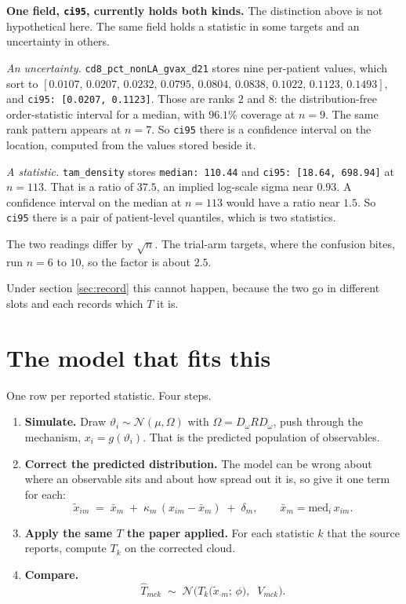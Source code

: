 \documentclass[11pt]{article}
\newcommand{\Ncal}{\mathcal{N}}
\begin{document}
\begin{assumpbox}
\textbf{One field, \texttt{ci95}, currently holds both kinds.} The distinction
above is not hypothetical here. The same field holds a statistic in some targets
and an uncertainty in others.

\emph{An uncertainty.} \texttt{cd8\_pct\_nonLA\_gvax\_d21} stores nine per-patient
values, which sort to $[0.0107,\,0.0207,\,0.0232,\,0.0795,\,0.0804,\,0.0838,\,
0.1022,\,0.1123,\,0.1493]$, and \texttt{ci95: [0.0207, 0.1123]}. Those are ranks
$2$ and $8$: the distribution-free order-statistic interval for a median, with
$96.1\%$ coverage at $n=9$. The same rank pattern appears at $n=7$. So
\texttt{ci95} there is a confidence interval on the location, computed from the
values stored beside it.

\emph{A statistic.} \texttt{tam\_density} stores \texttt{median: 110.44} and
\texttt{ci95: [18.64, 698.94]} at $n=113$. That is a ratio of $37.5$, an implied
log-scale sigma near $0.93$. A confidence interval on the median at $n=113$ would
have a ratio near $1.5$. So \texttt{ci95} there is a pair of patient-level
quantiles, which is two statistics.

The two readings differ by $\sqrt n$. The trial-arm targets, where the confusion
bites, run $n=6$ to $10$, so the factor is about $2.5$.

Under section \ref{sec:record} this cannot happen, because the two go in
different slots and each records which $T$ it is.
\end{assumpbox}

\section{The model that fits this}
\label{sec:model}

One row per reported statistic. Four steps.

\begin{enumerate}
\item \textbf{Simulate.} Draw $\vartheta_i\sim\Ncal(\mu,\Omega)$ with
      $\Omega=D_\omega R D_\omega$, push through the mechanism,
      $x_i=g(\vartheta_i)$. That is the predicted population of observables.
\item \textbf{Correct the predicted distribution.} The model can be wrong about
      where an observable sits and about how spread out it is, so give it one
      term for each:
      \begin{equation}
      \tilde x_{im} \;=\; \bar x_m \;+\; \kappa_m\,(x_{im}-\bar x_m) \;+\;
      \delta_m ,
      \qquad \bar x_m = \mathrm{med}_i\, x_{im}.
      \label{eq:correct}
      \end{equation}
\item \textbf{Apply the same $T$ the paper applied.} For each statistic $k$ that
      the source reports, compute $T_k$ on the corrected cloud.
\item \textbf{Compare.}
      \begin{equation}
      \widehat T_{mck} \;\sim\; \Ncal\!\Big(T_k\big(\tilde x_{\cdot m};\,\phi\big),
      \;\; V_{mck}\Big).
      \label{eq:row}
      \end{equation}
\end{enumerate}
\end{document}
